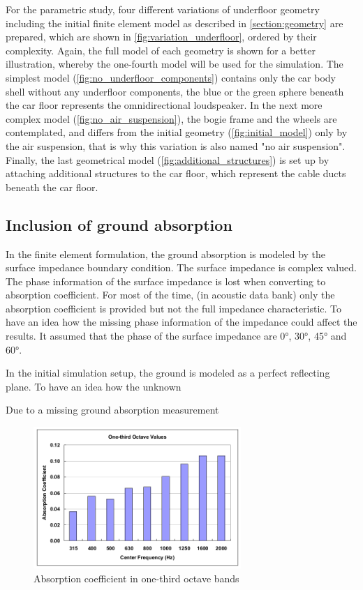 For the parametric study, four different variations of underfloor geometry including the initial finite element model as described in \cref{section:geometry} are prepared, which are shown in \cref{fig:variation_underfloor}, ordered by their complexity. Again, the full model of each geometry is shown for a better illustration, whereby the one-fourth model will be used for the simulation. The simplest model (\cref{fig:no_underfloor_components}) contains only the car body shell without any underfloor components, the blue or the green sphere beneath the car floor represents the omnidirectional loudspeaker. In the next more complex model (\cref{fig:no_air_suspension}), the bogie frame and the wheels are contemplated, and differs from the initial geometry (\cref{fig:initial_model}) only by the air suspension, that is why this variation is also named "no air suspension". Finally, the last geometrical model (\cref{fig:additional_structures}) is set up by attaching additional structures to the car floor, which represent the cable ducts beneath the car floor.

\newpage
\subsection{Inclusion of ground absorption}

In the finite element formulation, the ground absorption is modeled by the surface impedance boundary condition. The surface impedance is complex valued. The phase information of the surface impedance is lost when converting to absorption coefficient. For most of the time, (in acoustic data bank) only the absorption coefficient is provided but not the full impedance characteristic. To have an idea how the missing phase information of the impedance could affect the results. It assumed that the phase of the surface impedance are 0°, 30°, 45° and 60°.

In the initial simulation setup, the ground is modeled as a perfect reflecting plane. To have an idea how the unknown 

Due to a missing ground absorption measurement

\begin{figure}[H]
	\centering
	\includegraphics[width=0.7\textwidth]{fig/chap4/impedance/absorption_spectrum.png}
	\caption{Absorption coefficient in one-third octave bands \cite{Seybert2008MeasurementOP}}
	\label{fig:ground_absorption}
\end{figure}

